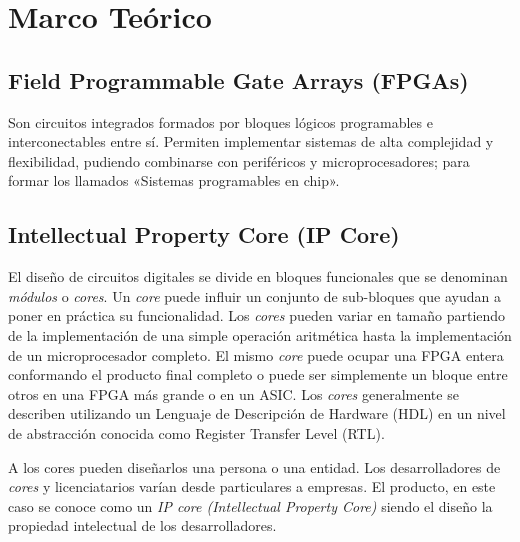 \documentclass[conference]{IEEEtran}
\begin{document}
\section{Marco Teórico} %

\subsection{Field Programmable Gate Arrays (FPGAs)}%
Son circuitos integrados formados por bloques lógicos 
programables e interconectables entre sí. Permiten 
implementar sistemas de alta complejidad y flexibilidad, 
pudiendo combinarse con periféricos y microprocesadores; 
para formar los llamados «Sistemas programables en chip».


\subsection{Intellectual Property Core (IP Core) }%

El diseño de circuitos digitales se divide en bloques
funcionales que se denominan \textit{módulos} o \textit{cores}. Un
\textit{core} puede influir un conjunto de sub-bloques que ayudan a
poner en práctica su funcionalidad. Los \textit{cores} pueden variar
en tamaño partiendo de la implementación de una simple operación
aritmética hasta la implementación de un microprocesador completo. El
mismo \textit{core} puede ocupar una FPGA entera conformando el
producto final completo o puede ser simplemente un bloque entre otros
en una FPGA más grande o en un ASIC. Los \textit{cores} generalmente se describen utilizando un Lenguaje de Descripción de Hardware (HDL)
en un nivel de abstracción conocida como Register Transfer Level
(RTL).

A los cores pueden diseñarlos una persona o una entidad. Los
desarrolladores de \textit{cores} y licenciatarios varían desde
particulares a empresas. El producto, en este caso se conoce como un
\textit{IP core (Intellectual Property Core)} siendo el diseño la
propiedad intelectual de los desarrolladores.
\end{document}
